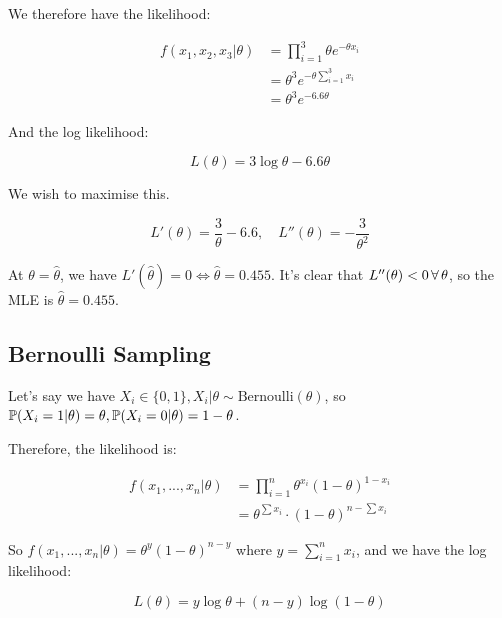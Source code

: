 \documentclass[a4paper]{article}
\begin{document}
                We therefore have the likelihood:

                \begin{align*}
                    f(x_1, x_2, x_3 | \theta) & = \prod_{i=1}^3 \theta e^{
                        -\theta x_i} \\
                    & = \theta^3 e^{-\theta \sum\limits_{i=1}^3 x_i} \\
                    & = \theta^3 e^{-6.6\theta}
                \end{align*}

                And the log likelihood:

                \[
                    L(\theta) = 3\log\theta - 6.6\theta
                \]

                We wish to maximise this.

                \[
                    L'(\theta) = \frac{3}{\theta} - 6.6, \quad L''(\theta) = -
                    \frac{3}{\theta^2}
                \]

                At $\theta = \widehat \theta$, we have $L'(\widehat \theta) = 0
                \iff \widehat \theta = 0.455$. It's clear that $L''(\theta) < 0
                \,\forall\, \theta$, so the MLE is $\widehat \theta = 0.455$.

        \subsection{Bernoulli Sampling}
            Let's say we have $X_i \in \{0, 1\}, X_i | \theta \sim
            \text{Bernoulli}(\theta)$, so $\mathbb{P}(X_i = 1 | \theta) = \theta,
            \mathbb{P}(X_i = 0 | \theta) = 1 - \theta$.

            Therefore, the likelihood is:

            \begin{align*}
                f(x_1, ..., x_n | \theta) & = \prod_{i=1}^n \theta^{x_i} (1 -
                    \theta)^{1-x_i} \\
                & = \theta^{\sum x_i} \cdot (1 - \theta)^{n - \sum x_i}
            \end{align*}

            So $f(x_1, ..., x_n | \theta) = \theta^y (1 - \theta)^{n - y}$ where
            $y = \sum\limits_{i=1}^n x_i$, and we have the log likelihood:

            \[
                L(\theta) = y\log{\theta} + (n - y)\log(1 - \theta)
            \]
\end{document}
